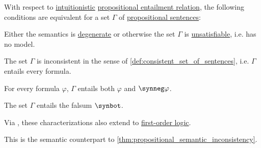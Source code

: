 \begin{proposition}\label{thm:propositional_semantic_inconsistency}
  With respect to \hyperref[def:truth_value_algebra/intuitionistic]{intuitionistic} \hyperref[def:propositional_semantics/entailment]{propositional entailment relation}, the following conditions are equivalent for a set \( \Gamma \) of \hyperref[def:propositional_formula]{propositional sentences}:
  \begin{thmenum}
     Either the semantics is \hyperref[def:truth_value_algebra/degenerate]{degenerate} or otherwise the set \( \Gamma \) is \hyperref[thm:propositional_semantic_inconsistency]{unsatisfiable}, i.e. has no model.

     The set \( \Gamma \) is inconsistent in the sense of \cref{def:consistent_set_of_sentences}, i.e. \( \Gamma \) entails every formula.

     For every formula \( \varphi \), \( \Gamma \) entails both \( \varphi \) and \( \synneg \varphi \).

     The set \( \Gamma \) entails the falsum \( \synbot \).
  \end{thmenum}
\end{proposition}
\begin{comments}
  \item Via , these characterizations also extend to \hyperref[def:first_order_logic]{first-order logic}.

  \item This is the semantic counterpart to \cref{thm:propositional_semantic_inconsistency}.
\end{comments}
